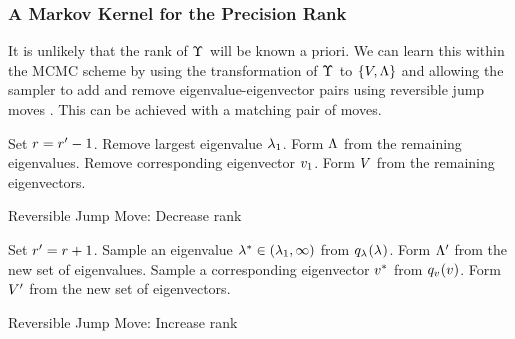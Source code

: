 \documentclass[journal,10pt]{IEEEtran}
\begin{document}
\subsubsection{A Markov Kernel for the Precision Rank}

It is unlikely that the rank of $\Upsilon_{}$ will be known a priori. We can learn this within the MCMC scheme by using the transformation of $\Upsilon_{}$ to $\{V,\Lambda\}$ and allowing the sampler to add and remove eigenvalue-eigenvector pairs using reversible jump moves \cite{Green1995,Green2009}. This can be achieved with a matching pair of moves.

\begin{algorithm}
\begin{algorithmic}
 \STATE Set $r = r' - 1$.
 \STATE Remove largest eigenvalue $\lambda_{1}$. Form $\tnmd$ from the remaining eigenvalues.
 \STATE Remove corresponding eigenvector $v_{1}$. Form $\tnmo$ from the remaining eigenvectors.
 \RETURN{$\tnd$, $\tnmd$, $\tnmo$}
\end{algorithmic}
\caption{Reversible Jump Move: Decrease rank}
\label{alg:rjmcmc-down}
\end{algorithm}

\begin{algorithm}
\begin{algorithmic}
 \REQUIRE{$\tnd$, $\tnmd$, $\tnmo$}
 \STATE Set $r' = r + 1$.
 \STATE Sample an eigenvalue $\lambda_{}^* \in (\lambda_{1},\infty)$ from $q_{\lambda_{}}(\lambda_{})$. Form $\Lambda'$ from the new set of eigenvalues.
 \STATE Sample a corresponding eigenvector $v_{}^*$ from $q_{v_{}}(v_{})$. Form $V'$ from the new set of eigenvectors.
\end{algorithmic}
\caption{Reversible Jump Move: Increase rank}
\label{alg:rjmcmc-up}
\end{algorithm}
\end{document}
